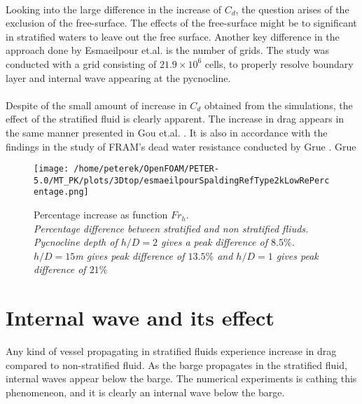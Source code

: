 \documentclass[a4paper, 12pt]{report}
\begin{document}
\\
Looking into the large difference in the increase of $C_d$, the question arises of the exclusion of the free-surface. The effects of the free-surface might be to significant in stratified waters to leave out the free surface. Another key difference in the approach done by Esmaeilpour et.al. is the number of grids. The study was conducted with a grid consisting of $21.9\times 10^6$ cells, to properly resolve boundary layer and internal wave appearing at the pycnocline.\\
\\
Despite of the small amount of increase in $C_d$ obtained from the simulations, the effect of the stratified fluid is clearly apparent. The increase in drag appears in the same manner presented in Gou et.al. \cite{Gou}. It is also in accordance with the findings in the study of FRAM's dead water resistance conducted by Grue \cite{Grue}. Grue 
\begin{figure}[H]
	\centering
	\texttt{[image: /home/peterek/OpenFOAM/PETER-5.0/MT\_PK/plots/3Dtop/esmaeilpourSpaldingRefType2kLowRePercentage.png]}
	\caption{Percentage increase as function $Fr_h$.  \\ \textit{Percentage difference between stratified and non stratified fliuds. Pycnocline depth of  $h/D=2$ gives a peak difference of $8.5\%$. $h/D=15$m gives peak difference of $13.5\%$ and $h/D=1$ gives peak difference of $21\%$}}
	\label{fig:CdPercentageDifference}
\end{figure}
\section{Internal wave and its effect}
Any kind of vessel propagating in stratified fluids experience increase in drag compared to non-stratified fluid. As the barge propagates in the stratified fluid, internal waves appear below the barge. The numerical experiments is cathing this phenomeneon, and it is clearly an internal wave below the barge.\\
\\
\end{document}
